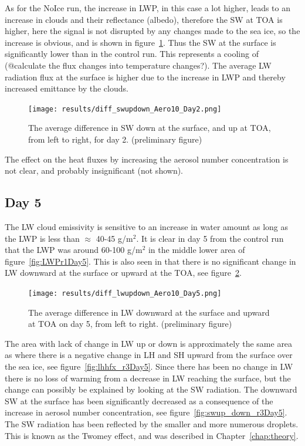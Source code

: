  As for the NoIce run, the increase in LWP, in this case a lot higher, leads to an increase in clouds and their reflectance (albedo), therefore the SW at TOA is higher, here the signal is not disrupted by any changes made to the sea ice, so the increase is obvious, and is shown in figure~\ref{fig:swup_down_r3Day2}. Thus the SW at the surface is significantly lower than in the control run. This represents a cooling of (@calculate the flux changes into temperature changes?). The average LW radiation flux at the surface is higher due to the increase in LWP and thereby increased emittance by the clouds.%
\begin{figure}
\centering
\texttt{[image: results/diff\_swupdown\_Aero10\_Day2.png]}
\caption{The average difference in SW down at the surface, and up at TOA, from left to right, for day 2. (preliminary figure)}
\label{fig:swup_down_r3Day2}
\end{figure}
The effect on the heat fluxes by increasing the aerosol number concentration is not clear, and probably insignificant (not shown).

\subsection{Day 5}
The LW cloud emissivity is sensitive to an increase in water amount as long as the LWP is less than $\approx$ 40-45 g/m$^2$. It is clear in day 5 from the control run that the LWP was around 60-100 g/m$^2$ in the middle lower area of figure~\ref{fig:LWPr1Day5}.%
This is also seen in that there is no significant change in LW downward at the surface or upward at the TOA, see figure~\ref{fig:lwup_down_r3Day5}.

\begin{figure}[h!]
\centering
\texttt{[image: results/diff\_lwupdown\_Aero10\_Day5.png]}
\caption{The average difference in LW downward at the surface and upward at TOA on day 5, from left to right. (preliminary figure)}
\label{fig:lwup_down_r3Day5}
\end{figure}

The area with lack of change in LW up or down is approximately the same area as where there is a negative change in LH and SH upward from the surface over the sea ice, see figure~\ref{fig:lhhfx_r3Day5}. Since there has been no change in LW there is no loss of warming from a decrease in LW reaching the surface, but the change can possibly be explained by looking at the SW radiation. The downward SW at the surface has been significantly decreased as a consequence of the increase in aerosol number concentration, see figure~\ref{fig:swup_down_r3Day5}. The SW radiation has been reflected by the smaller and more numerous droplets. This is known as the Twomey effect, and was described in Chapter~\ref{chap:theory}. 


